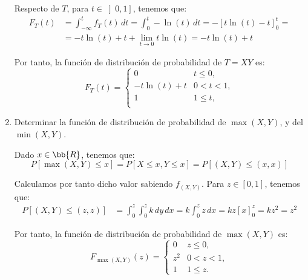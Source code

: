 \documentclass[12pt]{article}
\begin{document}
\begin{ejercicio}
\begin{enumerate}
            Respecto de $T$, para $t\in \left]0,1\right]$, tenemos que:
            \begin{align*}
                F_T(t)&=\int_{-\infty}^{t} f_T(t) \, dt = \int_{0}^{t} -\ln(t) \, dt = -\left[t\ln(t)-t\right]_{0}^{t} =\\&=
                -t\ln(t)+t +\lim_{t\to 0}t\ln(t) = -t\ln(t)+t
            \end{align*}
    
            Por tanto, la función de distribución de probabilidad de $T=XY$ es:
            \begin{equation*}
                F_T(t) = \begin{cases}
                    0 & t\leq 0, \\
                    -t\ln(t)+t & 0<t<1, \\
                    1 & 1\leq t, \\
                \end{cases}
            \end{equation*}
    
    
            \item Determinar la función de distribución de probabilidad de $\max(X,Y)$, y del $\min(X,Y)$.
            
            Dado $x\in \bb{R}$, tenemos que:
            \begin{equation*}
                P[\max(X,Y)\leq x]=P[X\leq x,Y\leq x] = P[(X,Y)\leq (x,x)]
            \end{equation*}
    
            Calculamos por tanto dicho valor sabiendo $f_{(X,Y)}$. Para $z\in [0,1]$, tenemos que:
            \begin{align*}
                P[(X,Y)\leq (z,z)]&=\int_{0}^{z}\int_{0}^{z} k \, dy \, dx = k\int_{0}^{z} z \, dx
                = kz\left[x\right]_{0}^{z} = kz^2 = z^2
            \end{align*}
    
            Por tanto, la función de distribución de probabilidad de $\max(X,Y)$ es:
            \begin{equation*}
                F_{\max(X,Y)}(z) = \begin{cases}
                    0 & z\leq 0, \\
                    z^2 & 0<z<1, \\
                    1 & 1\leq z.
                \end{cases}
            \end{equation*}
    

\end{enumerate}
\end{ejercicio}
\end{document}
